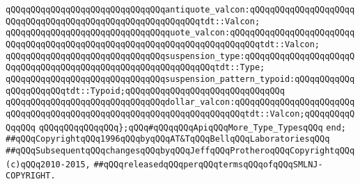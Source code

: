 \verb|qQQqqQQqqQQqqQQqqQQqqQQqqQQqqQQqantiquote_valcon:qQQqqQQqqQQqqQQqqQQqqQQqqQQqqQQqqQQqqQQqqQQqqQQqqQQqqQQqqQQqtdt::Valcon;|\newline
\verb|qQQqqQQqqQQqqQQqqQQqqQQqqQQqqQQqquote_valcon:qQQqqQQqqQQqqQQqqQQqqQQqqQQqqQQqqQQqqQQqqQQqqQQqqQQqqQQqqQQqqQQqqQQqqQQqqQQqtdt::Valcon;|\newline
\newline
\verb|qQQqqQQqqQQqqQQqqQQqqQQqqQQqqQQqsuspension_type:qQQqqQQqqQQqqQQqqQQqqQQqqQQqqQQqqQQqqQQqqQQqqQQqqQQqqQQqqQQqqQQqtdt::Type;|\newline
\verb|qQQqqQQqqQQqqQQqqQQqqQQqqQQqqQQqsuspension_pattern_typoid:qQQqqQQqqQQqqQQqqQQqqQQqtdt::Typoid;qQQqqQQqqQQqqQQqqQQqqQQqqQQqqQQq|\newline
\verb|qQQqqQQqqQQqqQQqqQQqqQQqqQQqqQQqdollar_valcon:qQQqqQQqqQQqqQQqqQQqqQQqqQQqqQQqqQQqqQQqqQQqqQQqqQQqqQQqqQQqqQQqqQQqqQQqtdt::Valcon;qQQqqQQqqQQqqQQq|\newline
\newline
\verb|qQQqqQQqqQQqqQQq};qQQq#qQQqqQQqApiqQQqMore_Type_TypesqQQq|\newline
\verb|end;|\newline
\newline
\verb|##qQQqCopyrightqQQq1996qQQqbyqQQqAT&TqQQqBellqQQqLaboratoriesqQQq|\newline
\verb|##qQQqSubsequentqQQqchangesqQQqbyqQQqJeffqQQqProtheroqQQqCopyrightqQQq(c)qQQq2010-2015,|\newline
\verb|##qQQqreleasedqQQqperqQQqtermsqQQqofqQQqSMLNJ-COPYRIGHT.|\newline

